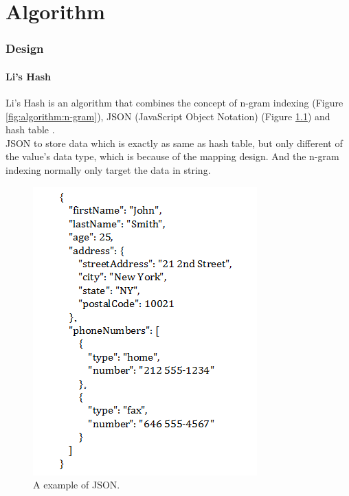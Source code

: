 \chapter{Algorithm}
\label{chapter:algorithm}

\baselineskip=26pt
\thispagestyle{empty}

\subsection{Design}

\subsubsection{Li's Hash}

Li's Hash is an algorithm that combines the concept of n-gram indexing \cite{web:wiki:n-gram} (Figure \ref{fig:algorithm:n-gram}), JSON (JavaScript Object Notation) \cite{web:wiki:json} (Figure \ref{fig:algorithm:json_example}) and hash table \cite{web:wiki:hash-table}.\\

JSON to store data which is exactly as same as hash table, but only different of the value's data type, which is because of the mapping design. And the n-gram indexing normally only target the data in string.\\

\begin{figure}[h]
\centering
\includegraphics[scale=0.7]{./algorithm/pic/json_example_v1.png}
\caption{A example of JSON.}
\label{fig:algorithm:json_example}
\end{figure}

